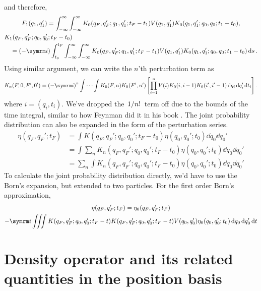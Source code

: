 and therefore,
\begin{gather}
    F_1(q_1, q_1') = \int_{-\infty}^{\infty}\int_{-\infty}^{\infty}K_0(q_F, q_F'; q_1, q_1'; t_F - t_1)V(q_1, q_1')K_0(q_1, q_1'; q_0, q_0; t_1 - t_0), \\
    \begin{multlined}
        K_1(q_F, q_F'; q_0, q_0'; t_F - t_0) \\= (-\im)\int_{t_0}^{t_F}\int_{-\infty}^{\infty}\int_{-\infty}^{\infty}K_0(q_F, q_F'; q_1, q_1'; t_F - t_1)V(q_1, q_1')K_0(q_1, q_1'; q_0, q_0; t_1 - t_0)\dd{s}.
    \end{multlined}
\end{gather}
Using similar argument, we can write the $n$'th perturbation term as
\begin{equation}
    K_n(F, 0; F', 0') = \left(-\im\right)^n\idotsint K_0(F, n)K_0(F', n')\left[\prod_{i = 1}^nV(i)K_0(i, i - 1)K_0(i', i' - 1)\dd{q_i}\dd{q_i'}\dd{t_i}\right]. \label{eq:generaltwoparticleperturbation}
\end{equation}
where $i = (q_i, t_i)$. We've dropped the $\flatfrac{1}{n!}$ term off due to the bounds of the time integral, similar to how Feynman did it in his book \cite{feynman-2010}. The joint probability distribution can also be expanded in the form of the perturbation series.
\begin{align}
    \eta(q_F, q_F'; t_F) &= \int K(q_F, q_F'; q_0, q_0'; t_F - t_0)\eta(q_0, q_0'; t_0)\dd{q_0}\dd{q_0'} \\
    &= \int \sum_n K_n(q_F, q_F'; q_0, q_0'; t_F - t_0)\eta(q_0, q_0'; t_0) \dd{q_0}\dd{q_0'} \\
    &= \sum_n \int K_n(q_F, q_F'; q_0, q_0'; t_F - t_0)\eta(q_0, q_0'; t_0) \dd{q_0}\dd{q_0'}
\end{align}
To calculate the joint probability distribution directly, we'd have to use the Born's expansion, but extended to two particles. For the first order Born's approximation,
\begin{multline}
    \eta(q_F, q_F'; t_F) = \eta_0(q_F, q_F'; t_F) \\- \im\iiint K(q_F, q_F'; q_0, q_0'; t_F - t)K(q_F, q_F'; q_0, q_0'; t_F - t)V(q_0, q_0')\eta_0(q_0, q_0'; t_0)\dd{q_0}\dd{q_0'}\dd{t}
\end{multline}

\section{Density operator and its related quantities in the position basis}

